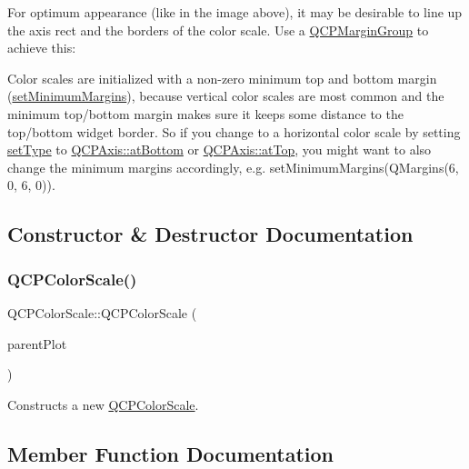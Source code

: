For optimum appearance (like in the image above), it may be desirable to line up the axis rect and the borders of the color scale. Use a \hyperlink{classQCPMarginGroup}{Q\+C\+P\+Margin\+Group} to achieve this\+: 
\begin{DoxyCodeInclude}
\end{DoxyCodeInclude}
 Color scales are initialized with a non-\/zero minimum top and bottom margin (\hyperlink{classQCPLayoutElement_a0a8a17abc16b7923159fcc7608f94673}{set\+Minimum\+Margins}), because vertical color scales are most common and the minimum top/bottom margin makes sure it keeps some distance to the top/bottom widget border. So if you change to a horizontal color scale by setting \hyperlink{classQCPColorScale_a1bf9bdb291927c422dd66b404b206f1f}{set\+Type} to \hyperlink{classQCPAxis_ae2bcc1728b382f10f064612b368bc18aa220d68888516b6c3b493d144f1ba438f}{Q\+C\+P\+Axis\+::at\+Bottom} or \hyperlink{classQCPAxis_ae2bcc1728b382f10f064612b368bc18aac0ece2b680d3f545e701f75af1655977}{Q\+C\+P\+Axis\+::at\+Top}, you might want to also change the minimum margins accordingly, e.\+g. {\ttfamily set\+Minimum\+Margins(\+Q\+Margins(6, 0, 6, 0))}. 

\subsection{Constructor \& Destructor Documentation}
\mbox{\label{classQCPColorScale_aa8debce1be38b54287c04d4f584394b4}} 
\subsubsection{\texorpdfstring{Q\+C\+P\+Color\+Scale()}{QCPColorScale()}}
{\footnotesize\ttfamily Q\+C\+P\+Color\+Scale\+::\+Q\+C\+P\+Color\+Scale (\begin{DoxyParamCaption}\item[{\hyperlink{classQCustomPlot}{Q\+Custom\+Plot} $\ast$}]{parent\+Plot }\end{DoxyParamCaption})\hspace{0.3cm}{\ttfamily [explicit]}}

Constructs a new \hyperlink{classQCPColorScale}{Q\+C\+P\+Color\+Scale}. 

\subsection{Member Function Documentation}
\mbox{\label{classQCPColorScale_a39bdbdb3b212602a5a57f9f3ea444190}} 
